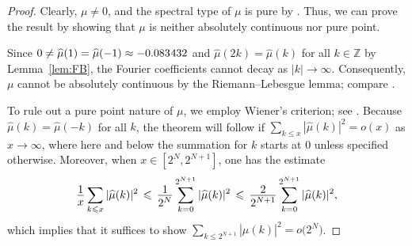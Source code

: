 \documentclass[11pt,a4paper]{amsart}
\theoremstyle{plain}
\theoremstyle{definition}
\numberwithin{equation}{section}
\newcommand{\ts}{\hspace{0.5pt}}
\newcommand{\ZZ}{\mathbb{Z}}
\newcommand{\myfrac}[2]{\frac{\raisebox{-2pt}{$#1$}}
      {\raisebox{0.5pt}{$#2$}}}
\begin{document}
\begin{proof}
  Clearly, $\mu\ne 0$, and the spectral type of $\mu$ is pure by
  \cite[Thm.~35]{JW}. Thus, we can prove the result by showing that
  $\mu$ is neither absolutely continuous nor pure point.

  Since $0 \ne \widehat{\mu} (1) = \widehat{\mu} (-1) \approx -
  0.083{\ts}432$
  and $\widehat{\mu} (2k) = \widehat{\mu} (k)$ for all $k\in\ZZ$ by
  Lemma~\ref{lem:FB}{\ts}, the Fourier coefficients cannot decay as
  $\lvert k \rvert \to \infty$. Consequently, $\mu$ cannot be absolutely
  continuous by the Riemann--Lebesgue lemma; compare
  \cite[Thm.~4.4.3]{RSt}.

  To rule out a pure point nature of $\mu$, we employ Wiener's
  criterion; see \cite[Prop.~8.9]{TAO}. Because
  $\widehat{\mu} (k)=\widehat{\mu} (-k)$ for all $k$, the theorem will
  follow if $\sum_{k\leqslant x}|\widehat{\mu} (k)|^2 = o(x)$ as
  $x\to\infty$, where here and below the summation for $k$ starts at
  $0$ unless specified otherwise. Moreover, when $x\in[2^N,2^{N+1}]$,
  one has the estimate
\[
  \myfrac{1}{x}\sum_{k\leqslant x}|\widehat{\mu} (k)|^2
  \, \leqslant \,
  \myfrac{1}{2^N}\sum_{k=0}^{2^{N+1}}|\widehat{\mu} (k)|^2
  \, \leqslant \,
  \myfrac{2}{2^{N+1}}\sum_{k=0}^{2^{N+1}}|\widehat{\mu} (k)|^2,
\]
which implies that it suffices to show
$\sum_{k\leqslant 2^{N+1}}|\widehat{\mu} (k)|^2=o \bigl( 2^{N} \bigr)$.


\end{proof}
\end{document}

